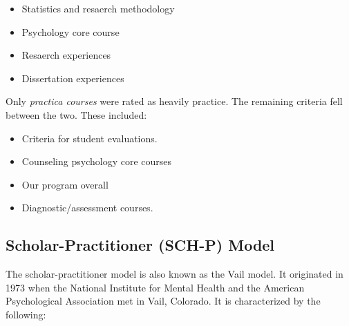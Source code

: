 \documentclass[
  english,
]{book}
\providecommand{\tightlist}{%
  \setlength{\itemsep}{0pt}\setlength{\parskip}{0pt}}
\begin{document}
\begin{itemize}
\tightlist
\item
  Statistics and resaerch methodology
\item
  Psychology core course
\item
  Resaerch experiences
\item
  Dissertation experiences
\end{itemize}

Only \emph{practica courses} were rated as heavily practice. The remaining criteria fell between the two. These included:

\begin{itemize}
\tightlist
\item
  Criteria for student evaluations.
\item
  Counseling psychology core courses
\item
  Our program overall
\item
  Diagnostic/assessment courses.
\end{itemize}

\hypertarget{scholar-practitioner-sch-p-model}{%
\subsection{Scholar-Practitioner (SCH-P) Model}\label{scholar-practitioner-sch-p-model}}

The scholar-practitioner model is also known as the Vail model. It originated in 1973 when the National Institute for Mental Health and the American Psychological Association met in Vail, Colorado. It is characterized by the following:
\end{document}
